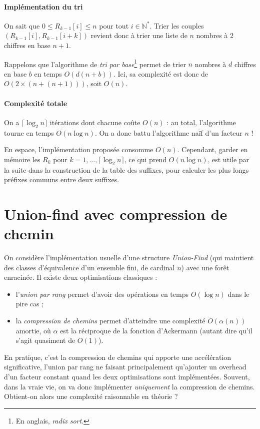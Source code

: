 \documentclass[a4paper, 11pt]{article}
\def\N{\mathbb{N}}
\begin{document}
\paragraph{Implémentation du tri}

On sait que $0 \leq R_{k-1}[i] \leq n$ pour tout $i \in \N^*$. Trier les couples
$(R_{k-1}[i], R_{k-1}[i+k])$ revient donc à trier une liste de $n$ nombres à 2
chiffres en base $n+1$.

Rappelons que l'algorithme de \emph{tri par base}\footnote{En anglais,
  \emph{radix sort}.} permet de trier $n$ nombres à $d$ chiffres en base $b$ en
temps $O(d(n+b))$. Ici, sa complexité est donc de $O(2 \times (n + (n+1)))$,
soit $O(n)$.

\paragraph{Complexité totale}

On a $\lceil \log_2 n \rceil$ itérations dont chacune coûte $O(n)$ : au total,
l'algorithme tourne en temps $O(n \log n)$. On a donc battu l'algorithme naïf
d'un facteur $n$ !

En espace, l'implémentation proposée consomme $O(n)$. Cependant, garder en
mémoire les $R_k$ pour $k = 1, \ldots, \lceil \log_2 n \rceil$, ce qui prend
$O(n \log n)$, est utile par la suite dans la construction de la table des
suffixes, pour calculer les plus longs préfixes communs entre deux suffixes.


\newpage



\section{Union-find avec compression de chemin}

On considère l'implémentation usuelle d'une structure \emph{Union-Find} (qui
maintient des classes d'équivalence d'un ensemble fini, de cardinal $n$) avec
une forêt enracinée. Il existe deux optimisations classiques :
\begin{itemize}
\item l'\emph{union par rang} permet d'avoir des opérations en temps $O(\log n)$
  dans le pire cas ;
\item la \emph{compression de chemins} permet d'atteindre une complexité
  $O(\alpha(n))$ amortie, où $\alpha$ est la réciproque de la fonction
  d'Ackermann (autant dire qu'il s'agit quasiment de $O(1)$).
\end{itemize}
En pratique, c'est la compression de chemins qui apporte une accélération
significative, l'union par rang ne faisant principalement qu'ajouter un overhead
d'un facteur constant quand les deux optimisations sont implémentées. Souvent,
dans la vraie vie, on va donc implémenter \emph{uniquement} la compression de
chemins. Obtient-on alors une complexité raisonnable en théorie ?
\end{document}
